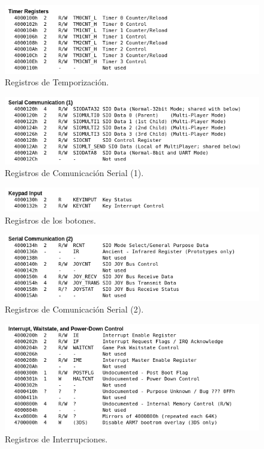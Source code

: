 \begin{figure}[h]
	\centering
	\includegraphics[width=.9\textwidth]{capitulos/apendice/reg_4.png}
	\caption{Registros de Temporización.}\label{fig:ap_reg_4}
\end{figure}

\begin{figure}[h]
	\centering
	\includegraphics[width=.9\textwidth]{capitulos/apendice/reg_5.png}
	\caption{Registros de Comunicación Serial (1).}\label{fig:ap_reg_5}
\end{figure}

\begin{figure}[h]
	\centering
	\includegraphics[width=.9\textwidth]{capitulos/apendice/reg_6.png}
	\caption{Registros de los botones.}\label{fig:ap_reg_6}
\end{figure}

\begin{figure}[h]
	\centering
	\includegraphics[width=.9\textwidth]{capitulos/apendice/reg_7.png}
	\caption{Registros de Comunicación Serial (2).}\label{fig:ap_reg_7}
\end{figure}

\begin{figure}[h]
	\centering
	\includegraphics[width=.9\textwidth]{capitulos/apendice/reg_8.png}
	\caption{Registros de Interrupciones.}\label{fig:ap_reg_8}
\end{figure}
\FloatBarrier{}



